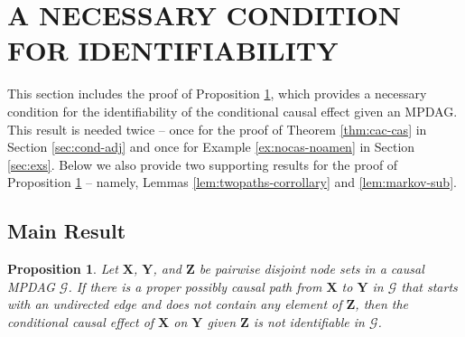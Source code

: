 \documentclass[twoside]{article}
\newtheorem{proposition}[theorem]{Proposition}
\newcommand{\mb}[1]{\mathbf{#1}}
\newcommand{\g}[1][G]{\mathcal{#1}}
\begin{document}

\section{A NECESSARY CONDITION FOR IDENTIFIABILITY}
\label{supp:necessary}

This section includes the proof of Proposition \ref{prop:id-necessary}, which provides a necessary condition for the identifiability of the conditional causal effect given an MPDAG. This result is needed twice -- once for the proof of Theorem \ref{thm:cac-cas} in Section \ref{sec:cond-adj} and once for Example \ref{ex:nocas-noamen} in Section \ref{sec:exs}. Below we also provide two supporting results for the proof of Proposition \ref{prop:id-necessary} -- namely, Lemmas \ref{lem:twopaths-corrollary} and \ref{lem:markov-sub}.



\subsection{Main Result}

\begin{proposition} 
\label{prop:id-necessary}
    Let $\mb{X}$, $\mb{Y}$, and $\mb{Z}$ be pairwise disjoint node sets in a causal MPDAG $\g$. If there is a proper possibly causal path from $\mb{X}$ to $\mb{Y}$ in $\g$ that starts with an undirected edge and does not contain any element of $\mb{Z}$, then the conditional causal effect of $\mb{X}$ on $\mb{Y}$ given $\mb{Z}$ is not identifiable in $\g$.
\end{proposition}
\end{document}
